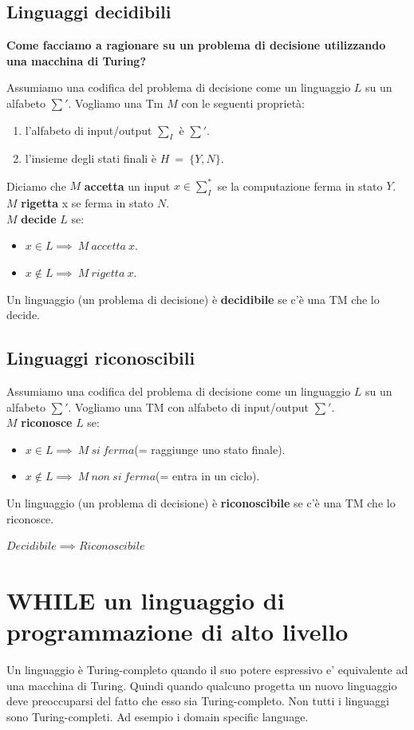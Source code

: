 \documentclass[a4paper, 12pt]{article}
\begin{document}
\subsection{Linguaggi decidibili}
\begin{center}
\textbf{Come facciamo a ragionare su un problema di decisione utilizzando una macchina di Turing?}
\end{center}
Assumiamo una codifica del problema di decisione come un linguaggio $L$ su un alfabeto $\sum'$. Vogliamo una Tm $M$ con le seguenti propriet\`a: \begin{enumerate}
\item l'alfabeto di input/output $\sum_{I}$ \`e $\sum'$.
\item l'insieme degli stati finali \`e $H\ =\ \{Y,N\}$.
\end{enumerate}
Diciamo che $M$ \textbf{accetta} un input $x \in \sum_{I}^{*}$ se la computazione ferma in stato $Y$. $M$ \textbf{rigetta} x se ferma in stato $N$.\\
$M$ \textbf{decide} $L$ se:
\begin{itemize}
\item $x \in L \implies\ M\ accetta\ x.$
\item $x \notin L \implies\ M\ rigetta\ x.$
\end{itemize}
Un linguaggio (un problema di decisione) \`e \textbf{decidibile} se c'\`e una TM che lo decide.
\subsection{Linguaggi riconoscibili}
Assumiamo una codifica del problema di decisione come un linguaggio $L$ su un alfabeto $\sum'$. Vogliamo una TM con alfabeto di input/output $\sum'$.\\
$M$ \textbf{riconosce} $L$ se:
\begin{itemize}
\item $x \in L \implies\ M\ si\ ferma$(= raggiunge uno stato finale).
\item $x \notin L \implies\ M\ non\ si\ ferma$(= entra in un ciclo).
\end{itemize}
Un linguaggio (un problema di decisione) \`e \textbf{riconoscibile} se c'\`e una TM che lo riconosce.\\
\begin{center}
$Decidibile \implies Riconoscibile$
\end{center}
\newpage
\section{WHILE un linguaggio di programmazione di alto livello	}
Un linguaggio \`e Turing-completo quando il suo potere espressivo e' equivalente ad una macchina di Turing. 
Quindi quando qualcuno progetta un nuovo linguaggio deve preoccuparsi del fatto che esso sia Turing-completo.
Non tutti i linguaggi sono Turing-completi. Ad esempio i domain specific language.
\end{document}
